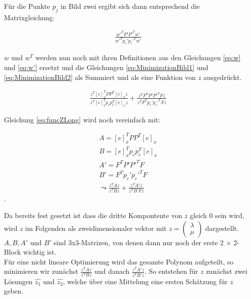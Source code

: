 Für die Punkte $p_j$ in Bild zwei ergibt sich dann entsprechend die Matrixgleichung:

\begin{gather}
	\frac{w'^TP'P'^Tw'}{w'^Tp_c'p_c'^Tw'}\label{eq:MinimizationBild2}
\end{gather} 


$w$ und $w^T$ werden nun noch mit ihren Definitionen aus den Gleichungen \ref{eq:w} und \ref{eq:w'} ersetzt und die Gleichungen \ref{eq:MinimizationBild1} und \ref{eq:MinimizationBild2} als Summiert und als eine Funktion von $z$ ausgedrückt\cite{ZZ}. 


\begin{gather}
	\frac{z^T[e]_x^TPP^T[e]_xz}{z^T[e]_x^Tp_cp_c^T[e]_xz}+\frac{z^TF^TP'P'^TFz}{z^TF^Tp_c'p_c'^TFz} \label{eq:funcZLong}
\end{gather}

Gleichung \ref{eq:funcZLong} wird noch vereinfach mit:

\begin{gather}
	A = [e]_x^TPP^T[e]_x\\
	B=[e]_x^Tp_cp_c^T[e]_x\\
	A'=F^TP'P'^TF\\
	B'= F^Tp_c'p_c'^TF\\
	\leadsto 
	\frac{z^TAz}{z^TBz}+\frac{z^TA'z}{z^TB'Fz}
\end{gather}
.

Da bereits fest gesetzt ist dass die dritte Kompontente von $z$ gleich 0 sein wird, wird $z$ im Folgenden als zweidimensionaler vektor mit $z = \begin{pmatrix}
\lambda\\ \mu\end{pmatrix}$ dargestellt. $A,B,A'$ und $B'$ sind 3x3-Matrizen, von denen dann nur noch der erste 2 $\times$ 2- Block wichtig ist.\\

Für eine nicht lineare Optimierung wird das gesamte Polynom aufgeteilt, so minimieren wir zunächst $\frac{z^TAz}{z^TBz}$ und danach $\frac{z^TA'z}{z^TB'z}$. So entstehen für $z$ zunächst zwei Lösungen $\hat{z_1}$ und $\hat{z_2}$, welche über eine Mittelung eine ersten Schätzung für $z$ geben\cite{ZZ}.


